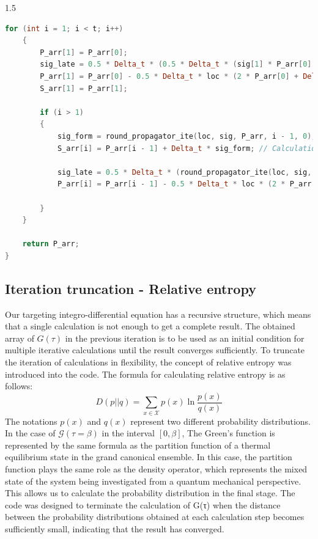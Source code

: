 \documentclass{article}[12pt]
\numberwithin{equation}{section}
\begin{document}
\begin{spacing}{1.5}
\begin{lstlisting}[language=C++, caption=Trapezoidal calculation code]
    for (int i = 1; i < t; i++)
    {
        P_arr[1] = P_arr[0];
        sig_late = 0.5 * Delta_t * (0.5 * Delta_t * (sig[1] * P_arr[0] + sig[0] * (P_arr[0] + Delta_t * P_arr[0])));
        P_arr[1] = P_arr[0] - 0.5 * Delta_t * loc * (2 * P_arr[0] + Delta_t * P_arr[0]) + sig_late;
        S_arr[1] = P_arr[1];

        if (i > 1)
        {
            sig_form = round_propagator_ite(loc, sig, P_arr, i - 1, 0);
            S_arr[i] = P_arr[i - 1] + Delta_t * sig_form; // Calculation process of 2. is performed in this part.

            sig_late = 0.5 * Delta_t * (round_propagator_ite(loc, sig, P_arr, i - 1, 1) + round_propagator_ite(loc, sig, S_arr, i, 1)); // This part is the result of performing trapezoidal calculation for the integral calculation in the round propagator.
            P_arr[i] = P_arr[i - 1] - 0.5 * Delta_t * loc * (2 * P_arr[i - 1] + Delta_t * sig_form) + sig_late; // This part is the result of performing trapezoidal calculation for the integral calculation in the round propagator.

        }
    }

    return P_arr;
}
\end{lstlisting}
\subsection{Iteration truncation - Relative entropy}

Our targeting integro-differential equation has a recursive structure, which means that a single calculation is not enough to get a complete result. The obtained array of $G(\tau)$ in the previous iteration is to be used as an initial condition for multiple iterative calculations until the result converges sufficiently. To truncate the iteration of calculations in flexibility, the concept of relative entropy was introduced into the code. The formula for calculating relative entropy is as follows:
\begin{equation*}
D(p||q) = \sum_{x\in\mathcal{X}}p(x)\ln\frac{p(x)}{q(x)}
\end{equation*}
The notations $p(x)$ and $q(x)$ represent two different probability distributions.
In the case of $\mathcal{G}(\tau = \beta)$ in the interval $[0,\beta]$, The Green's function is represented by the same formula as the partition function of a thermal equilibrium state in the grand canonical ensemble. In this case, the partition function plays the same role as the density operator, which represents the mixed state of the system being investigated from a quantum mechanical perspective.
This allows us to calculate the probability distribution in the final stage. The code was designed to terminate the calculation of G(τ) when the distance between the probability distributions obtained at each calculation step becomes sufficiently small, indicating that the result has converged.


\end{spacing}
\end{document}
